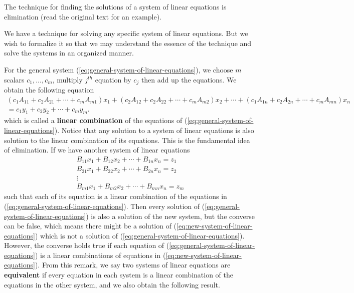 The technique for finding the solutions of a system of linear equations is elimination (read the original text for an example).

We have a technique for solving any specific system of linear equations. But we wish to formalize it so that we may understand the essence of the technique and solve the systems in an organized manner.

For the general system (\ref{eq:general-system-of-linear-equations}), we choose $m$ scalars $c_{1}, \ldots, c_{m}$, multiply $j^{th}$ equation by $c_{j}$ then add up the equations. We obtain the following equation
\begin{multline*}
	(c_{1}A_{11} + c_{2}A_{21} + \cdots + c_{m}A_{m1})x_{1} + (c_{2}A_{12} + c_{2}A_{22} + \cdots + c_{m}A_{m2})x_{2} + \cdots + (c_{1}A_{1n} + c_{2}A_{2n} + \cdots + c_{m}A_{mn})x_{n} \\
	= c_{1}y_{1} + c_{2}y_{2} + \cdots + c_{m}y_{m}.
\end{multline*}
which is called a \textbf{linear combination} of the equations of (\ref{eq:general-system-of-linear-equations}). Notice that any solution to a system of linear equations is also solution to the linear combination of its equations. This is the fundamental idea of elimination. If we have another system of linear equations
\begin{equation}
	\begin{split}
		B_{11}x_{1} + B_{12}x_{2} + \cdots + B_{1n}x_{n} = z_{1}  \\
		B_{21}x_{1} + B_{22}x_{2} + \cdots + B_{2n}x_{n} = z_{2}  \\
		\vdots \\
		B_{m1}x_{1} + B_{m2}x_{2} + \cdots + B_{mn}x_{n} = z_{m}
	\end{split}\label{eq:new-system-of-linear-equations}
\end{equation}
such that each of its equation is a linear combination of the equations in (\ref{eq:general-system-of-linear-equations}). Then every solution of (\ref{eq:general-system-of-linear-equations}) is also a solution of the new system, but the converse can be false, which means there might be a solution of (\ref{eq:new-system-of-linear-equations}) which is not a solution of (\ref{eq:general-system-of-linear-equations}). However, the converse holds true if each equation of (\ref{eq:general-system-of-linear-equations}) is a linear combinations of equations in (\ref{eq:new-system-of-linear-equations}). From this remark, we say two systems of linear equations are \textbf{equivalent} if every equation in each system is a linear combination of the equations in the other system, and we also obtain the following result.

